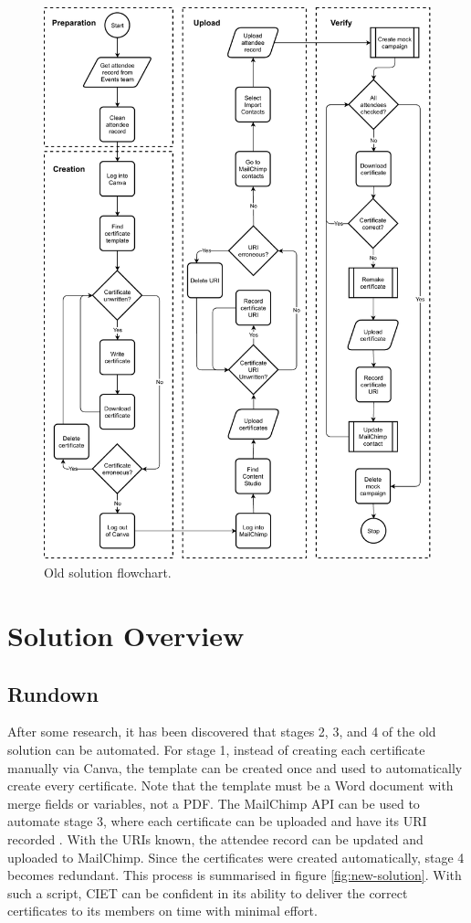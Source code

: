 \documentclass[11pt]{article}
\begin{document}
\begin{figure}[h!]
    \includegraphics[width=\textwidth]{figures/old_solution.pdf}
    \caption{Old solution flowchart.}
    \label{fig:old-solution}
\end{figure}

\newpage

\section{Solution Overview}

\subsection{Rundown}

After some research, it has been discovered that stages 2, 3, and 4 of the old solution can be automated. For stage 1, instead of creating each certificate manually via Canva, the template can be created once and used to automatically create every certificate. Note that the template must be a Word document with merge fields or variables, not a PDF. The MailChimp API can be used to automate stage 3, where each certificate can be uploaded and have its URI recorded \cite{mailchimp-api}. With the URIs known, the attendee record can be updated and uploaded to MailChimp. Since the certificates were created automatically, stage 4 becomes redundant. This process is summarised in figure \ref{fig:new-solution}. With such a script, CIET can be confident in its ability to deliver the correct certificates to its members on time with minimal effort.
\end{document}
